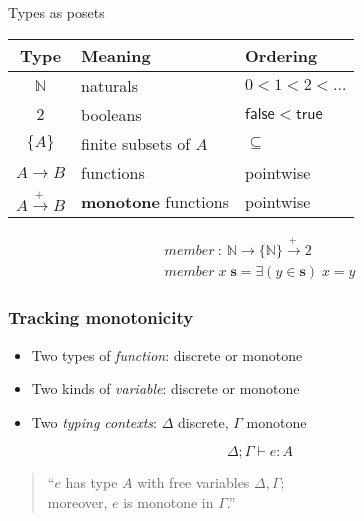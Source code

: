 \documentclass{beamer}
\newcommand{\mto}{\overset{\textbf{+}\:}{\to}}
\newcommand{\ms}{\mathsf}
\begin{document}
\begin{frame}{Types as posets}\Large

  \begin{center}
    \begin{tabular}{cll}
      \textbf{Type} & \textbf{Meaning} & \textbf{Ordering}
      \\\hline
      $\mathbb{N}$ & naturals & $0 < 1 < 2 < \hdots$\\
      $2$ & booleans & $\ms{false} < \ms{true}$\\
      $\{A\}$      & finite subsets of $A$ & ${\subseteq}$\\
      $A \to B$    & functions & pointwise\\
      $A \mto B$  & \textbf{monotone} functions & pointwise
    \end{tabular}
  \end{center}

  \vspace{0.75em}\pause

  \[\begin{array}{l}
    member ~:~ \mathbb{N} \to \{\mathbb{N}\} \mto 2\\
    member\; x\; \mathbf{s} = \exists(y \in \mathbf{s})\; x = y
  \end{array}\]
\end{frame}

\begin{frame}
  \frametitle{Tracking monotonicity}

  \Large
  \begin{itemize}
  \item Two types of \emph{function}: discrete or monotone
  \item Two kinds of \emph{variable}: discrete or monotone
  \item Two \emph{typing contexts}: $\Delta$ discrete, $\Gamma$ monotone
  \end{itemize}

  {\huge\[\Delta;\Gamma \vdash e : A\]}

  \begin{quote}
    \hspace{-1.1ex}``$e$ has type $A$ with free variables $\Delta,\Gamma$;\\
    moreover, $e$ is monotone in $\Gamma$.''
  \end{quote}
\end{frame}
\end{document}

